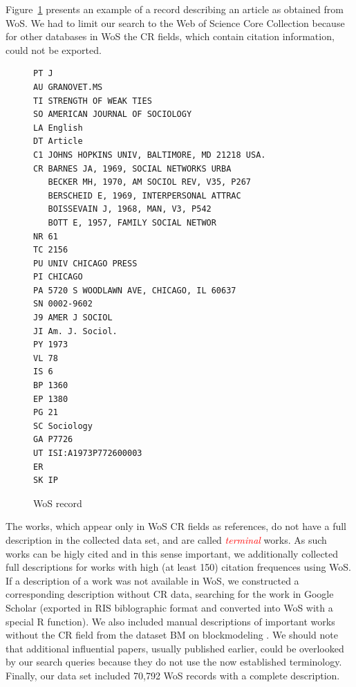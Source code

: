 \documentclass[11pt]{article} %
\newcommand{\keyw}[1]{\textcolor{red}{\emph{#1}}}
\begin{document}
Figure~\ref{wos} presents an example of a record describing an article as obtained from WoS. We had to limit our search to the Web of Science Core Collection because for other databases in WoS the CR fields, which contain citation information, could not be exported. \medskip

\begin{figure}
\renewcommand{\baselinestretch}{0.8}
\scriptsize
\begin{verbatim}
PT J
AU GRANOVET.MS
TI STRENGTH OF WEAK TIES
SO AMERICAN JOURNAL OF SOCIOLOGY
LA English
DT Article
C1 JOHNS HOPKINS UNIV, BALTIMORE, MD 21218 USA.
CR BARNES JA, 1969, SOCIAL NETWORKS URBA
   BECKER MH, 1970, AM SOCIOL REV, V35, P267
   BERSCHEID E, 1969, INTERPERSONAL ATTRAC
   BOISSEVAIN J, 1968, MAN, V3, P542
   BOTT E, 1957, FAMILY SOCIAL NETWOR
NR 61
TC 2156
PU UNIV CHICAGO PRESS
PI CHICAGO
PA 5720 S WOODLAWN AVE, CHICAGO, IL 60637
SN 0002-9602
J9 AMER J SOCIOL
JI Am. J. Sociol.
PY 1973
VL 78
IS 6
BP 1360
EP 1380
PG 21
SC Sociology
GA P7726
UT ISI:A1973P772600003
ER
SK IP
\end{verbatim}
\caption{WoS record}\label{wos}
\end{figure}

The works, which appear only in WoS CR fields as references, do not have a full description in the collected data set, and are called \keyw{terminal} works. As such works can be higly cited and in this sense important, we additionally collected full descriptions for works with high (at least 150) citation frequences using WoS. If a description of a work was not available in WoS, we constructed a corresponding description without CR data, searching for the work in Google Scholar (exported in RIS biblographic format and converted into WoS with a special R function). We also included manual descriptions of important works without the CR field from the dataset BM on blockmodeling \citep{batagelj2019}. We should note that additional influential papers, usually published earlier, could be overlooked by our search queries because they do not use the now established terminology. Finally, our data set included 70,792 WoS records with a complete description.  \medskip
\end{document}
